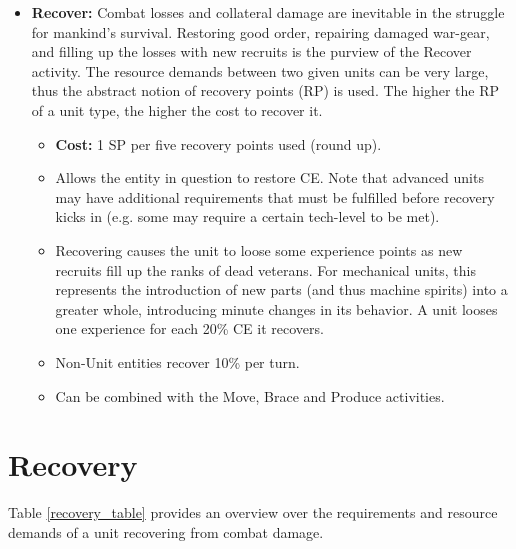 \begin{itemize}
	\item \textbf{Recover:} Combat losses and collateral damage are inevitable in the struggle for mankind's survival. Restoring good order, repairing damaged war-gear, and filling up the losses with new recruits is the purview of the Recover activity. The resource demands between two given units can be very large, thus the abstract notion of recovery points (RP) is used. The higher the RP of a unit type, the higher the cost to recover it.
	\begin{itemize}
		\item \textbf{Cost:} 1 SP per five recovery points used (round up).
		\item Allows the entity in question to restore CE. Note that advanced units may have additional requirements that must be fulfilled before recovery kicks in (e.g. some may require a certain tech-level to be met).
		\item Recovering causes the unit to loose some experience points as new recruits fill up the ranks of dead veterans. For mechanical units, this represents the introduction of new parts (and thus machine spirits) into a greater whole, introducing minute changes in its behavior. A unit looses one experience for each 20\% CE it recovers.
		\item Non-Unit entities recover 10\% per turn.
		\item Can be combined with the Move, Brace and Produce activities.
	\end{itemize}   
\end{itemize}

\section{Recovery} \label{recovery_section}
Table \ref{recovery_table} provides an overview over the requirements and resource demands of a unit recovering from combat damage.

\onecolumn
